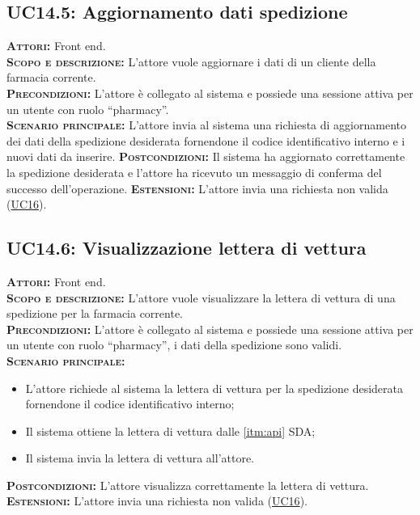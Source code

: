 \subsection{UC14.5: Aggiornamento dati spedizione}
\label{sec:UC145}
\textsc{\textbf{Attori:}} Front end.\\
\textsc{\textbf{Scopo e descrizione:}} L'attore vuole aggiornare i dati di un cliente della farmacia corrente.\\
\textsc{\textsc{\textbf{Precondizioni:}}} L'attore è collegato al sistema e possiede una sessione attiva per un utente con ruolo ``pharmacy''.\\
\textsc{\textbf{Scenario principale:}} L'attore invia al sistema una richiesta di aggiornamento dei dati della spedizione desiderata fornendone il codice identificativo interno e i nuovi dati da inserire.
\textsc{\textbf{Postcondizioni:}} Il sistema ha aggiornato correttamente la spedizione desiderata e l'attore ha ricevuto un messaggio di conferma del successo dell'operazione.
\textsc{\textbf{Estensioni:}} L'attore invia una richiesta non valida (\hyperref[sec:UC16]{UC16}).

\subsection{UC14.6: Visualizzazione lettera di vettura}
\label{sec:UC146}
\textsc{\textbf{Attori:}} Front end.\\
\textsc{\textbf{Scopo e descrizione:}} L'attore vuole visualizzare la lettera di vettura di una spedizione per la farmacia corrente.\\
\textsc{\textsc{\textbf{Precondizioni:}}} L'attore è collegato al sistema e possiede una sessione attiva per un utente con ruolo ``pharmacy'', i dati della spedizione sono validi.\\
\textsc{\textbf{Scenario principale:}} 
\begin{itemize}
    \item L'attore richiede al sistema la lettera di vettura per la spedizione desiderata fornendone il codice identificativo interno;
    \item Il sistema ottiene la lettera di vettura dalle \ref{itm:api} SDA;
    \item Il sistema invia la lettera di vettura all'attore.
\end{itemize}
\textsc{\textbf{Postcondizioni:}} L'attore visualizza correttamente la lettera di vettura.\\
\textsc{\textbf{Estensioni:}} L'attore invia una richiesta non valida (\hyperref[sec:UC16]{UC16}).


